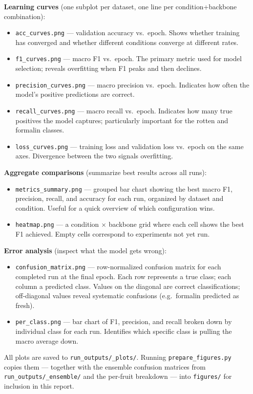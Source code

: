 \documentclass[12pt, a4paper]{article}
\begin{document}
\textbf{Learning curves} (one subplot per dataset, one line per
condition+backbone combination):
\begin{itemize}
    \item \texttt{acc\_curves.png} --- validation accuracy vs.\ epoch.
    Shows whether training has converged and whether different conditions
    converge at different rates.
    \item \texttt{f1\_curves.png} --- macro F1 vs.\ epoch.
    The primary metric used for model selection; reveals overfitting when
    F1 peaks and then declines.
    \item \texttt{precision\_curves.png} --- macro precision vs.\ epoch.
    Indicates how often the model's positive predictions are correct.
    \item \texttt{recall\_curves.png} --- macro recall vs.\ epoch.
    Indicates how many true positives the model captures; particularly
    important for the rotten and formalin classes.
    \item \texttt{loss\_curves.png} --- training loss and validation loss
    vs.\ epoch on the same axes.
    Divergence between the two signals overfitting.
\end{itemize}

\textbf{Aggregate comparisons} (summarize best results across all runs):
\begin{itemize}
    \item \texttt{metrics\_summary.png} --- grouped bar chart showing the
    best macro F1, precision, recall, and accuracy for each run, organized
    by dataset and condition.
    Useful for a quick overview of which configuration wins.
    \item \texttt{heatmap.png} --- a condition $\times$ backbone grid where
    each cell shows the best F1 achieved.
    Empty cells correspond to experiments not yet run.
\end{itemize}

\textbf{Error analysis} (inspect what the model gets wrong):
\begin{itemize}
    \item \texttt{confusion\_matrix.png} --- row-normalized confusion matrix
    for each completed run at the final epoch.
    Each row represents a true class; each column a predicted class.
    Values on the diagonal are correct classifications; off-diagonal values
    reveal systematic confusions (e.g.\ formalin predicted as fresh).
    \item \texttt{per\_class.png} --- bar chart of F1, precision, and recall
    broken down by individual class for each run.
    Identifies which specific class is pulling the macro average down.
\end{itemize}

All plots are saved to \texttt{run\_outputs/\_plots/}.
Running \texttt{prepare\_figures.py} copies them --- together with the ensemble
confusion matrices from \texttt{run\_outputs/\_ensemble/} and the per-fruit
breakdown --- into \texttt{figures/} for inclusion in this report.
\end{document}
